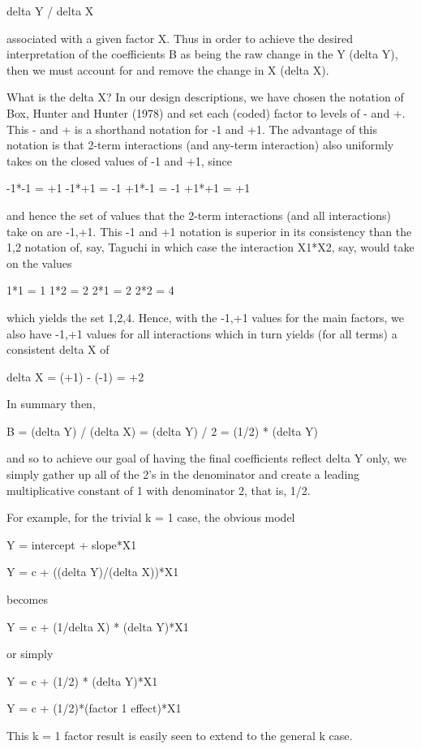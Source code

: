    delta Y / delta X

associated with a given factor X. Thus in order to
achieve the desired interpretation of the
coefficients B as being the raw change in the Y
(delta Y), then we must account for and remove the
change in X (delta X).

What is the delta X? In our design descriptions,
we have chosen the notation of Box, Hunter and
Hunter (1978) and set each (coded) factor to
levels of - and +. This - and + is a shorthand
notation for -1 and +1.  The advantage of this
notation is that 2-term interactions (and any-term
interaction) also uniformly takes on the closed
values of -1 and +1, since

   -1*-1 = +1
   -1*+1 = -1
   +1*-1 = -1
   +1*+1 = +1

and hence the set of values that the 2-term
interactions (and all interactions) take on are
{-1,+1}.  This -1 and +1 notation is superior in
its consistency than the 1,2 notation of, say,
Taguchi in which case the interaction X1*X2, say,
would take on the values

   1*1 = 1
   1*2 = 2
   2*1 = 2
   2*2 = 4

which yields the set {1,2,4}.  Hence, with the
-1,+1 values for the main factors, we also have
-1,+1 values for all interactions which in turn
yields (for all terms) a consistent delta X of

   delta X = (+1) - (-1) = +2

In summary then,

   B = (delta Y) / (delta X) = (delta Y) / 2
                             = (1/2) * (delta Y)

and so to achieve our goal of having the final
coefficients reflect delta Y only, we simply
gather up all of the 2's in the denominator and
create a leading multiplicative constant of 1 with
denominator 2, that is, 1/2.

For example, for the trivial k = 1 case, the
obvious model

   Y = intercept + slope*X1

   Y = c + ((delta Y)/(delta X))*X1

 becomes

   Y = c + (1/delta X) * (delta Y)*X1

or simply

   Y = c + (1/2) * (delta Y)*X1

   Y = c + (1/2)*(factor 1 effect)*X1

This k = 1 factor result is easily seen to extend
to the general k case.

